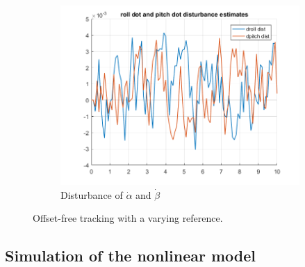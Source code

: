 \documentclass[11pt]{article}
\begin{document}
\begin{enumerate}
\begin{figure}[ht]
\begin{subfigure}[c]{0.3\linewidth}
            \includegraphics[width=\linewidth]{Plots_10_OffsetFreeTracking_Varying/10}
            \caption{Disturbance of $\dot{\alpha}$ and $\dot{\beta}$}
        \end{subfigure}
        \caption{Offset-free tracking with a varying reference.}
        \label{fig:offset_free_tracking_with_varying}
\end{figure}
    
\end{enumerate}



\subsection*{Simulation of the nonlinear model} %
\label{sub:simulation_of_the_nonlinear_model}
\end{document}
